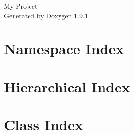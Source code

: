 \let\mypdfximage\pdfximage\def\pdfximage{\immediate\mypdfximage}\documentclass[twoside]{book}
\newcommand{\+}{\discretionary{\mbox{\scriptsize$\hookleftarrow$}}{}{}}
\newcommand{\clearemptydoublepage}{%
  \newpage{\pagestyle{empty}\cleardoublepage}%
}
\begin{document}
\raggedbottom

\hypersetup{pageanchor=false,
             bookmarksnumbered=true,
             pdfencoding=unicode
            }
\begin{titlepage}
\vspace*{7cm}
\begin{center}%
{\Large My Project }\\
\vspace*{1cm}
{\large Generated by Doxygen 1.9.1}\\
\end{center}
\end{titlepage}
\clearemptydoublepage
{}
\tableofcontents
\clearemptydoublepage
{}
\hypersetup{pageanchor=true}

\chapter{Namespace Index}

\chapter{Hierarchical Index}

\chapter{Class Index}

\end{document}
